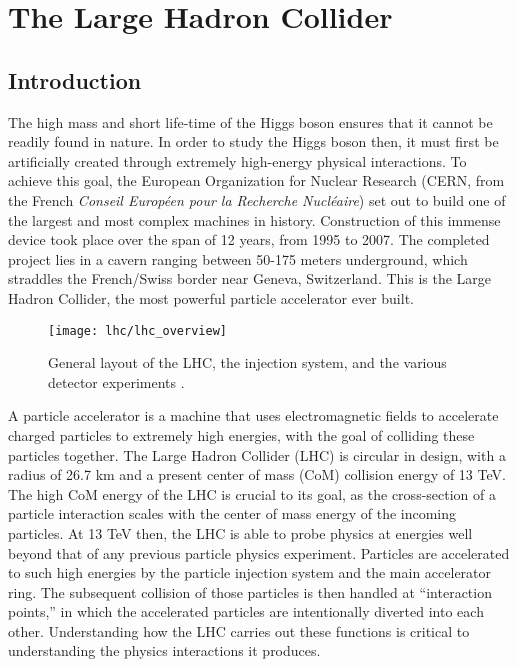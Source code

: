\chapter{The Large Hadron Collider}\label{chapter:lhc}

\section{Introduction}

    The high mass and short life-time of the Higgs boson ensures that it cannot be readily found in nature.
    In order to study the Higgs boson then, it must first be artificially created through extremely high-energy physical interactions.
    To achieve this goal, the European Organization for Nuclear Research
        (CERN, from the French \textit{Conseil Européen pour la Recherche Nucléaire})
        set out to build one of the largest and most complex machines in history.
    Construction of this immense device took place over the span of 12 years, from 1995 to 2007.
    The completed project lies in a cavern ranging between 50-175 meters underground, which straddles the French/Swiss border near Geneva, Switzerland.
    This is the Large Hadron Collider, the most powerful particle accelerator ever built.

    \begin{figure}[h]
        \texttt{[image: lhc/lhc\_overview]}
        \caption{General layout of the LHC, the injection system, and the various detector experiments \cite{lhc_run2}.}
        \label{fig:lhc_overview}
    \end{figure}

    A particle accelerator is a machine that uses electromagnetic fields to accelerate charged particles to extremely high energies, with the goal of colliding these particles together.
    The Large Hadron Collider (LHC) is circular in design, with a radius of 26.7 km and a present center of mass (CoM) collision energy of 13 TeV.
    The high CoM energy of the LHC is crucial to its goal, as the cross-section of a particle interaction scales with the center of mass energy of the incoming particles.
    At 13 TeV then, the LHC is able to probe physics at energies well beyond that of any previous particle physics experiment.
    Particles are accelerated to such high energies by the particle injection system and the main accelerator ring.
    The subsequent collision of those particles is then handled at ``interaction points,'' in which the accelerated particles are intentionally diverted into each other.
    Understanding how the LHC carries out these functions is critical to understanding the physics interactions it produces.


